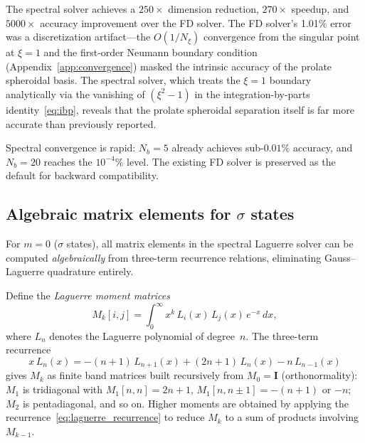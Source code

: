 \documentclass[aps,pra,twocolumn,superscriptaddress,longbibliography]{revtex4-2}
\begin{document}
The spectral solver achieves a $250\times$ dimension reduction,
$270\times$ speedup, and $5000\times$ accuracy improvement over
the FD solver.  The FD solver's 1.01\% error was a discretization
artifact---the $O(1/N_\xi)$ convergence from the singular point
at $\xi = 1$ and the first-order Neumann boundary condition
(Appendix~\ref{app:convergence}) masked the intrinsic accuracy of
the prolate spheroidal basis.  The spectral solver, which treats
the $\xi = 1$ boundary analytically via the vanishing of
$(\xi^2 - 1)$ in the integration-by-parts identity~\eqref{eq:ibp},
reveals that the prolate spheroidal separation itself is far more
accurate than previously reported.

Spectral convergence is rapid: $N_b = 5$ already achieves
sub-$0.01\%$ accuracy, and $N_b = 20$ reaches the
$10^{-4}\%$ level.  The existing FD solver is preserved as the
default for backward compatibility.

\subsection{Algebraic matrix elements for \texorpdfstring{$\sigma$}{sigma} states}
\label{sec:algebraic}

For $m = 0$ ($\sigma$ states), all matrix elements in the spectral
Laguerre solver can be computed \emph{algebraically} from three-term
recurrence relations, eliminating Gauss--Laguerre quadrature entirely.

Define the \emph{Laguerre moment matrices}
\begin{equation}
  M_k[i,j] = \int_0^\infty x^k\,L_i(x)\,L_j(x)\,e^{-x}\,dx,
  \label{eq:laguerre_moment}
\end{equation}
where $L_n$ denotes the Laguerre polynomial of degree~$n$.
The three-term recurrence
\begin{equation}
  x\,L_n(x) = -(n+1)\,L_{n+1}(x) + (2n+1)\,L_n(x) - n\,L_{n-1}(x)
  \label{eq:laguerre_recurrence}
\end{equation}
gives $M_k$ as finite band matrices built recursively from
$M_0 = \mathbf{I}$ (orthonormality): $M_1$ is tridiagonal with
$M_1[n,n] = 2n+1$, $M_1[n, n\pm 1] = -(n+1)$ or $-n$;
$M_2$ is pentadiagonal, and so on.  Higher moments are obtained by
applying the recurrence~\eqref{eq:laguerre_recurrence} to reduce
$M_k$ to a sum of products involving $M_{k-1}$.
\end{document}
